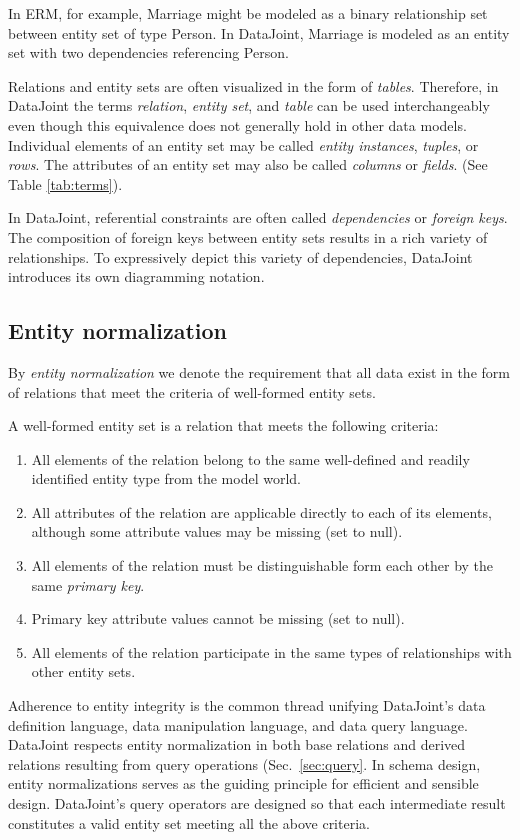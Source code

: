 \documentclass[letter,10pt]{article}
\newcommand{\datajoint}{DataJoint\xspace}
\begin{document}
In ERM, for example, Marriage might be modeled as a binary relationship set between entity set of type Person.  In \datajoint, Marriage is modeled as an entity set with two dependencies referencing Person. 

Relations and entity sets are often visualized in the form of \emph{tables}. 
Therefore, in \datajoint the terms \emph{relation}, \emph{entity set}, and \emph{table} can be used interchangeably even though this equivalence does not generally hold in other data models. 
Individual elements of an entity set may be called \emph{entity instances}, \emph{tuples}, or \emph{rows}.
The attributes of an entity set may also be called \emph{columns} or \emph{fields}. (See Table \ref{tab:terms}).

In \datajoint, referential constraints are often called \emph{dependencies} or \emph{foreign keys}.  
The composition of foreign keys between entity sets results in a rich variety of relationships. 
To expressively depict this variety of dependencies, \datajoint introduces its own diagramming notation.

\subsection{Entity normalization}\label{sec:norm}
By \emph{entity normalization} we denote the requirement that all data exist in the form of relations that meet the criteria of well-formed entity sets.

A well-formed entity set is a relation that meets the following criteria:
\begin{enumerate}
\item All elements of the relation belong to the same well-defined and readily identified entity type from the model world.
\item All attributes of the relation are applicable directly to each of its elements, although some attribute values may be missing (set to null).  
\item All elements of the relation must be distinguishable form each other by the same \emph{primary key}.
\item Primary key attribute values cannot be missing (set to null).
\item All elements of the relation participate in the same types of relationships with other entity sets.
\end{enumerate}

Adherence to entity integrity is the common thread unifying \datajoint's data definition language, data manipulation language, and data query language. 
\datajoint respects entity normalization in both base relations and derived relations resulting from query operations (Sec.\ \ref{sec:query}.  
In schema design, entity normalizations serves as the guiding principle for efficient and sensible design.
\datajoint's query operators are designed so that each intermediate result constitutes a valid entity set meeting all the above criteria.
\end{document}
